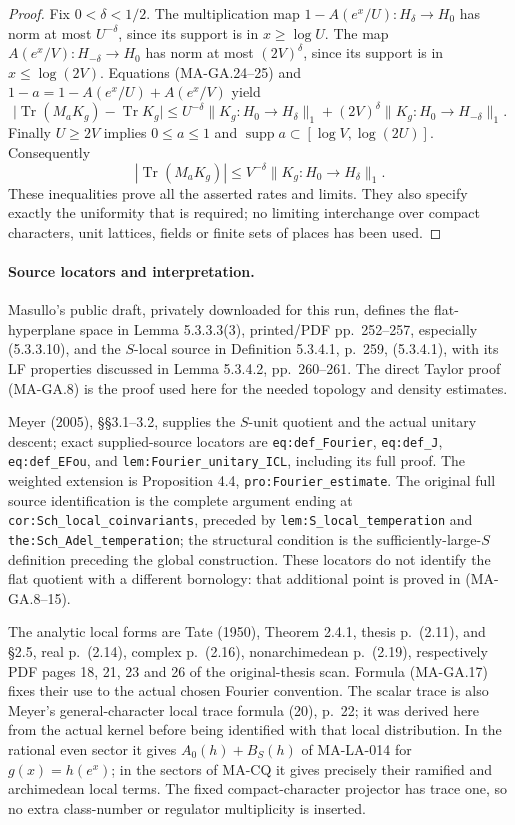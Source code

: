 \begin{proof}
Fix $0<\delta<1/2$.  The multiplication map
$1-A(e^x/U):H_\delta\to H_0$ has norm at most
$U^{-\delta}$, since its support is in $x\geq\log U$.
The map $A(e^x/V):H_{-\delta}\to H_0$ has norm at most
$(2V)^\delta$, since its support is in
$x\leq\log(2V)$.  Equations (MA-GA.24--25) and
$1-a=1-A(e^x/U)+A(e^x/V)$ yield
\[
 \bigl|\operatorname{Tr}(M_aK_g)-\operatorname{Tr}K_g\bigr|
       \leq U^{-\delta}\|K_g:H_0\to H_\delta\|_1
            +(2V)^\delta\|K_g:H_0\to H_{-\delta}\|_1.
 \tag{MA-GA.31}
\]
Finally $U\geq2V$ implies $0\leq a\leq1$ and
$\operatorname{supp}a\subset[\log V,\log(2U)]$.
Consequently
\[
      |\operatorname{Tr}(M_aK_g)|
           \leq V^{-\delta}\|K_g:H_0\to H_\delta\|_1.
 \tag{MA-GA.32}
\]
These inequalities prove all the asserted rates and limits.
They also specify exactly the uniformity that is required;
no limiting interchange over compact characters, unit
lattices, fields or finite sets of places has been used.
\end{proof}

\paragraph{Source locators and interpretation.}
Masullo's public draft, privately downloaded for this run,
defines the flat-hyperplane
space in Lemma 5.3.3.3(3), printed/PDF pp.~252--257,
especially (5.3.3.10), and the $S$-local source in
Definition 5.3.4.1, p.~259, (5.3.4.1), with its LF
properties discussed in Lemma 5.3.4.2, pp.~260--261.
The direct Taylor proof (MA-GA.8) is the proof used here
for the needed topology and density estimates.

Meyer (2005), \S\S3.1--3.2, supplies the $S$-unit quotient
and the actual unitary descent; exact supplied-source
locators are \texttt{eq:def\_Fourier}, \texttt{eq:def\_J},
\texttt{eq:def\_EFou}, and
\texttt{lem:Fourier\_unitary\_ICL}, including its full proof.
The weighted extension is Proposition 4.4,
\texttt{pro:Fourier\_estimate}.  The original full source
identification is the complete argument ending at
\texttt{cor:Sch\_local\_coinvariants}, preceded by
\texttt{lem:S\_local\_temperation} and
\texttt{the:Sch\_Adel\_temperation}; the structural condition
is the sufficiently-large-$S$ definition preceding the
global construction.  These locators do not identify
the flat quotient with a different bornology: that
additional point is proved in (MA-GA.8--15).

The analytic local forms are Tate (1950), Theorem 2.4.1,
thesis p.~(2.11), and \S2.5, real p.~(2.14), complex
p.~(2.16), nonarchimedean p.~(2.19), respectively PDF
pages 18, 21, 23 and 26 of the original-thesis scan.
Formula (MA-GA.17) fixes their use to the actual chosen
Fourier convention.  The scalar trace is also Meyer's
general-character local trace formula (20), p.~22;
it was derived here from the actual kernel before being
identified with that local distribution.  In the rational
even sector it gives $A_0(h)+B_S(h)$ of MA-LA-014 for
$g(x)=h(e^x)$; in the sectors of MA-CQ it gives precisely
their ramified and archimedean local terms.  The fixed
compact-character projector has trace one, so no extra
class-number or regulator multiplicity is inserted.

